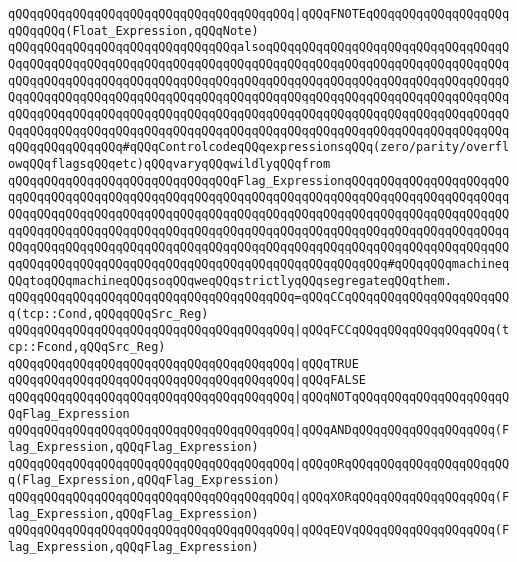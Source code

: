 \newline
\verb|qQQqqQQqqQQqqQQqqQQqqQQqqQQqqQQqqQQqqQQq|\verb#|qQQqFNOTEqQQqqQQqqQQqqQQqqQQqqQQqqQQq(Float_Expression,qQQqNote)#\newline
\newline
\verb|qQQqqQQqqQQqqQQqqQQqqQQqqQQqqQQqalsoqQQqqQQqqQQqqQQqqQQqqQQqqQQqqQQqqQQqqQQqqQQqqQQqqQQqqQQqqQQqqQQqqQQqqQQqqQQqqQQqqQQqqQQqqQQqqQQqqQQqqQQqqQQqqQQqqQQqqQQqqQQqqQQqqQQqqQQqqQQqqQQqqQQqqQQqqQQqqQQqqQQqqQQqqQQqqQQqqQQqqQQqqQQqqQQqqQQqqQQqqQQqqQQqqQQqqQQqqQQqqQQqqQQqqQQqqQQqqQQqqQQqqQQqqQQqqQQqqQQqqQQqqQQqqQQqqQQqqQQqqQQqqQQqqQQqqQQqqQQqqQQqqQQqqQQqqQQqqQQqqQQqqQQqqQQqqQQqqQQqqQQqqQQqqQQqqQQqqQQqqQQqqQQqqQQqqQQqqQQqqQQqqQQqqQQqqQQqqQQq#qQQqControlcodeqQQqexpressionsqQQq(zero/parity/overflowqQQqflagsqQQqetc)qQQqvaryqQQqwildlyqQQqfrom|\newline
\verb|qQQqqQQqqQQqqQQqqQQqqQQqqQQqqQQqFlag_ExpressionqQQqqQQqqQQqqQQqqQQqqQQqqQQqqQQqqQQqqQQqqQQqqQQqqQQqqQQqqQQqqQQqqQQqqQQqqQQqqQQqqQQqqQQqqQQqqQQqqQQqqQQqqQQqqQQqqQQqqQQqqQQqqQQqqQQqqQQqqQQqqQQqqQQqqQQqqQQqqQQqqQQqqQQqqQQqqQQqqQQqqQQqqQQqqQQqqQQqqQQqqQQqqQQqqQQqqQQqqQQqqQQqqQQqqQQqqQQqqQQqqQQqqQQqqQQqqQQqqQQqqQQqqQQqqQQqqQQqqQQqqQQqqQQqqQQqqQQqqQQqqQQqqQQqqQQqqQQqqQQqqQQqqQQqqQQqqQQqqQQqqQQqqQQqqQQqqQQq#qQQqqQQqmachineqQQqtoqQQqmachineqQQqsoqQQqweqQQqstrictlyqQQqsegregateqQQqthem.|\newline
\verb|qQQqqQQqqQQqqQQqqQQqqQQqqQQqqQQqqQQqqQQq=qQQqCCqQQqqQQqqQQqqQQqqQQqqQQq(tcp::Cond,qQQqqQQqSrc_Reg)|\newline
\verb|qQQqqQQqqQQqqQQqqQQqqQQqqQQqqQQqqQQqqQQq|\verb#|qQQqFCCqQQqqQQqqQQqqQQqqQQq(tcp::Fcond,qQQqSrc_Reg)#\newline
\verb|qQQqqQQqqQQqqQQqqQQqqQQqqQQqqQQqqQQqqQQq|\verb#|qQQqTRUE#\newline
\verb|qQQqqQQqqQQqqQQqqQQqqQQqqQQqqQQqqQQqqQQq|\verb#|qQQqFALSE#\newline
\verb|qQQqqQQqqQQqqQQqqQQqqQQqqQQqqQQqqQQqqQQq|\verb#|qQQqNOTqQQqqQQqqQQqqQQqqQQqqQQqFlag_Expression#\newline
\verb|qQQqqQQqqQQqqQQqqQQqqQQqqQQqqQQqqQQqqQQq|\verb#|qQQqANDqQQqqQQqqQQqqQQqqQQq(Flag_Expression,qQQqFlag_Expression)#\newline
\verb|qQQqqQQqqQQqqQQqqQQqqQQqqQQqqQQqqQQqqQQq|\verb#|qQQqORqQQqqQQqqQQqqQQqqQQqqQQq(Flag_Expression,qQQqFlag_Expression)#\newline
\verb|qQQqqQQqqQQqqQQqqQQqqQQqqQQqqQQqqQQqqQQq|\verb#|qQQqXORqQQqqQQqqQQqqQQqqQQq(Flag_Expression,qQQqFlag_Expression)#\newline
\verb|qQQqqQQqqQQqqQQqqQQqqQQqqQQqqQQqqQQqqQQq|\verb#|qQQqEQVqQQqqQQqqQQqqQQqqQQq(Flag_Expression,qQQqFlag_Expression)#\newline
